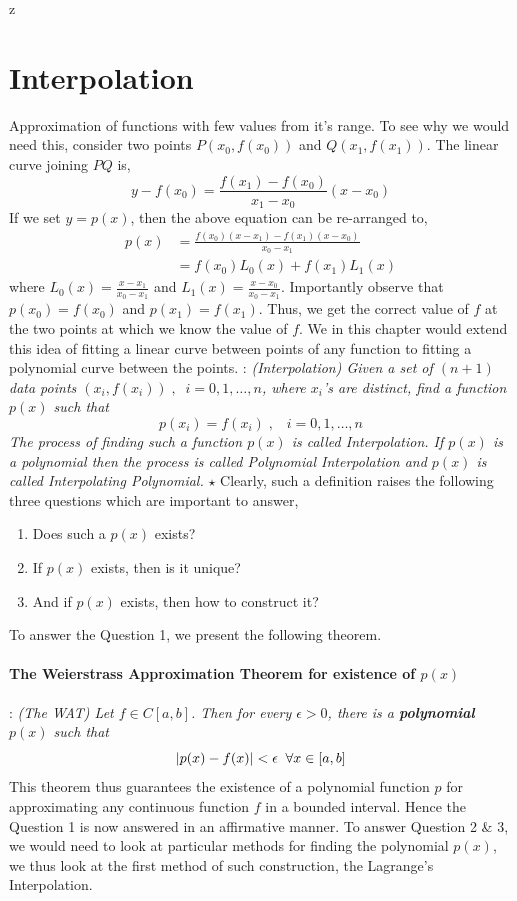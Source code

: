 z\documentclass[a4paper,12pt,twoside]{book}
\newcommand{\nll}[0]{\newline\newline}
\newcommand{\tit}[1]{\textit{#1}}
\newcommand{\theor}[1]{\boxed{\textbf{\textit{Theorem \thechapter.#1}}}}
\newcommand{\defin}[0]{\boxed{\textbf{\textit{Definition}}}}
\DeclarePairedDelimiter\abs{\lvert}{\rvert}
\begin{document}
\chapter{Interpolation}
Approximation of functions with few values from it's range.
\nll
To see why we would need this, consider two points $P(x_0, f(x_0))$ and $Q(x_1, f(x_1))$. The linear curve joining $PQ$ is,
\[ y - f(x_0) = \frac{f(x_1) - f(x_0)}{x_1 - x_0} (x - x_0)\]
If we set $y=p(x)$, then the above equation can be re-arranged to,
\begin{equation*}
    \begin{split}
        p(x) &= \frac{f(x_0)(x-x_1) - f(x_1)(x-x_0)}{x_0-x_1}\\
        &= f(x_0) L_0(x) + f(x_1)L_1(x)
    \end{split}
\end{equation*}
where $L_0(x) = \frac{x-x_1}{x_0 - x_1}$ and $L_1(x) = \frac{x-x_0}{x_0 - x_1}$. \nll
Importantly observe that $p(x_0) = f(x_0)$ and $p(x_1) = f(x_1)$. Thus, we get the correct value of $f$ at the two points at which we know the value of $f$. We in this chapter would extend this idea of fitting a linear curve between points of any function to fitting a polynomial curve between the points.
\nll
\defin  : \tit{(Interpolation) Given a set of $(n+1)$ data points $(x_i, f(x_i))\;, \;\; i = 0,1,\dots,n$, where $x_i$'s are distinct, find a function $p(x)$ such that
\[p(x_i) = f(x_i)\;,\;\;\;i=0,1,\dots,n\]
The process of finding such a function $p(x)$ is called Interpolation. If $p(x)$ is a polynomial then the process is called Polynomial Interpolation and $p(x)$ is called Interpolating Polynomial.}
\nll
$\star$ Clearly, such a definition raises the following three questions which are important to answer,
\begin{enumerate}
    \item {Does such a $p(x)$ exists?}
    \item{If $p(x)$ exists, then is it unique?}
    \item{And if $p(x)$ exists, then how to construct it?}
\end{enumerate}
To answer the Question 1, we present the following theorem.
\subsubsection{The Weierstrass Approximation Theorem for existence of $p(x)$}
\theor{5}  : \tit{(The WAT) Let $f\in C[a,b]$. Then for every $\epsilon > 0$, there is a \textbf{polynomial} $p(x)$ such that}
\[\abs*{p(x) - f(x)} < \epsilon\;\;\forall x\in [a,b]\]
This theorem thus guarantees the existence of a polynomial function $p$ for approximating any continuous function $f$ in a bounded interval. Hence the Question 1 is now answered in an affirmative manner. 
\nll
To answer Question 2 \& 3, we would need to look at particular methods for finding the polynomial $p(x)$, we thus look at the first method of such construction, the Lagrange's Interpolation.
\end{document}
